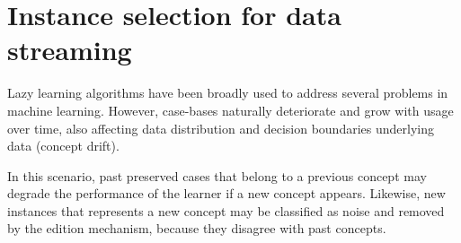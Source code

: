 \documentclass[preprint,12pt]{elsarticle}
\begin{document}


\section{Instance selection for data streaming}

Lazy learning algorithms have been broadly used to address several problems in machine learning. However, case-bases naturally deteriorate and grow with usage over time, also affecting data distribution and decision boundaries underlying data (concept drift).

In this scenario, past preserved cases that belong to a previous concept may degrade the performance of the learner if a new concept appears. Likewise, new instances that represents a new concept may be classified as noise and removed by the edition mechanism, because they disagree with past concepts. 
\end{document}

